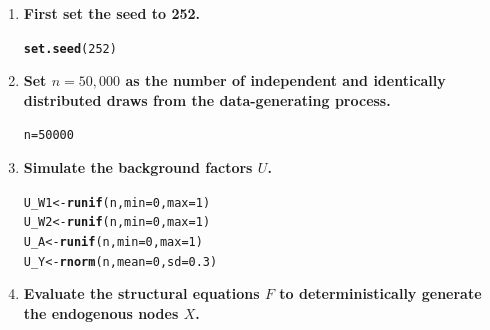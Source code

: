 \documentclass{article}\usepackage[]{graphicx}\usepackage[]{xcolor}
\makeatletter
\newcommand{\hlnum}[1]{\textcolor[rgb]{0.686,0.059,0.569}{#1}}%
\newcommand{\hlstd}[1]{\textcolor[rgb]{0.345,0.345,0.345}{#1}}%
\newcommand{\hlkwb}[1]{\textcolor[rgb]{0.69,0.353,0.396}{#1}}%
\newcommand{\hlkwc}[1]{\textcolor[rgb]{0.333,0.667,0.333}{#1}}%
\newcommand{\hlkwd}[1]{\textcolor[rgb]{0.737,0.353,0.396}{\textbf{#1}}}%
\newenvironment{kframe}{%
 \def\at@end@of@kframe{}%
 \ifinner\ifhmode%
  \def\at@end@of@kframe{\end{minipage}}%
  \begin{minipage}{\columnwidth}%
 \fi\fi%
 \def\FrameCommand##1{\hskip\@totalleftmargin \hskip-\fboxsep
 \colorbox{shadecolor}{##1}\hskip-\fboxsep
     \hskip-\linewidth \hskip-\@totalleftmargin \hskip\columnwidth}%
 \MakeFramed {\advance\hsize-\width
   \@totalleftmargin\z@ \linewidth\hsize
   \@setminipage}}%
 {\par\unskip\endMakeFramed%
 \at@end@of@kframe}
\newenvironment{knitrout}{}{} %
\makeatother
\begin{document}
    \begin{enumerate}[label=\textbf{\arabic*.}]
    
      \item \textbf{First set the seed to 252.}
      
\begin{knitrout}
\color{fgcolor}\begin{kframe}
\begin{alltt}
\hlkwd{set.seed}\hlstd{(}\hlnum{252}\hlstd{)}
\end{alltt}
\end{kframe}
\end{knitrout}
      
      \item \textbf{Set $n = 50,000$ as the number of independent and identically distributed draws from the data-generating process.}
      
\begin{knitrout}
\color{fgcolor}\begin{kframe}
\begin{alltt}
\hlstd{n} \hlkwb{=} \hlnum{50000}
\end{alltt}
\end{kframe}
\end{knitrout}
      
      \item \textbf{Simulate the background factors $U$.}
      
\begin{knitrout}
\color{fgcolor}\begin{kframe}
\begin{alltt}
\hlstd{U_W1} \hlkwb{<-} \hlkwd{runif}\hlstd{(n,} \hlkwc{min} \hlstd{=} \hlnum{0}\hlstd{,} \hlkwc{max} \hlstd{=} \hlnum{1}\hlstd{)}
\hlstd{U_W2} \hlkwb{<-} \hlkwd{runif}\hlstd{(n,} \hlkwc{min} \hlstd{=} \hlnum{0}\hlstd{,} \hlkwc{max} \hlstd{=} \hlnum{1}\hlstd{)}
\hlstd{U_A} \hlkwb{<-} \hlkwd{runif}\hlstd{(n,} \hlkwc{min} \hlstd{=} \hlnum{0}\hlstd{,} \hlkwc{max} \hlstd{=} \hlnum{1}\hlstd{)}
\hlstd{U_Y} \hlkwb{<-} \hlkwd{rnorm}\hlstd{(n,} \hlkwc{mean} \hlstd{=} \hlnum{0}\hlstd{,} \hlkwc{sd} \hlstd{=} \hlnum{0.3}\hlstd{)}
\end{alltt}
\end{kframe}
\end{knitrout}
      
      \item \textbf{Evaluate the structural equations $F$ to deterministically generate the endogenous nodes $X$.}
      

\end{enumerate}
\end{document}

